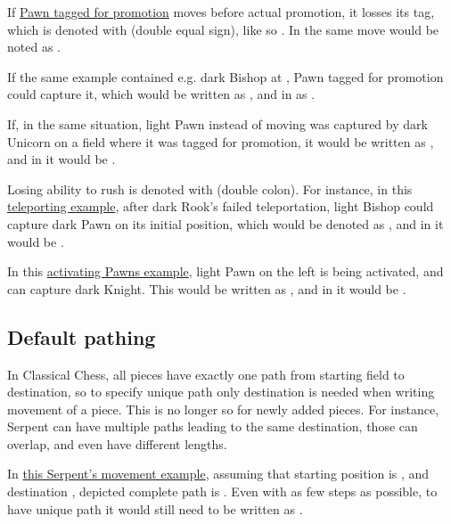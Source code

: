 If \hyperref[fig:scn_aoa_04_delayed_promo_pawn_2_tagged]{Pawn tagged for promotion} moves
before actual promotion, it losses its tag, which is denoted with \alg{==} (double equal
sign), like so . In  the same move would be noted as .

If the same example contained e.g. dark Bishop at , Pawn tagged for promotion could
capture it, which would be written as , and in  as .

If, in the same situation, light Pawn instead of moving was captured by dark Unicorn on a
field where it was tagged for promotion, it would be written as , and in
 it would be .

Losing ability to rush is denoted with \alg{::} (double colon). For instance, in this
\hyperref[fig:scn_n_03_teleport_move_2]{teleporting example}, after dark Rook's failed
teleportation, light Bishop could capture dark Pawn on its initial position, which would
be denoted as , and in  it would be .

In this \hyperref[fig:scn_mv_31_activating_rush_pawn_init]{activating Pawns example}, light
Pawn on the left is being activated, and can capture dark Knight. This would be written as
, and in  it would be
\alg{[Re6-e2]\~{}[We2-c2]\~{}[P::c2-b3*N]}.

\subsection*{Default pathing}
\label{sec:Appendix/Notation/Default pathing}

In Classical Chess, all pieces have exactly one path from starting field to destination,
so to specify unique path only destination is needed when writing movement of a piece.
This is no longer so for newly added pieces. For instance, Serpent can have multiple paths
leading to the same destination, those can overlap, and even have different lengths.

In \hyperref[fig:scn_tr_05_serpent_end]{this Serpent's movement example}, assuming that
starting position is , and destination , depicted complete path is
. Even with as few steps as possible, to have unique path
it would still need to be written as .

